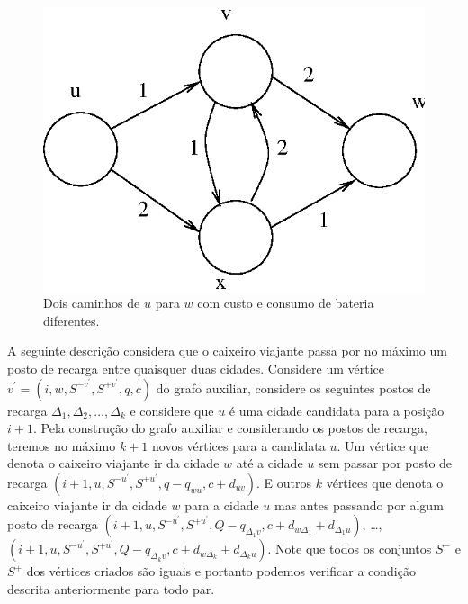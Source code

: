 \documentclass{article}
\begin{document}
\begin{figure}[ht]
  \centering
  \includegraphics[scale=.7]{fig3.eps}
  \caption{Dois caminhos de $u$ para $w$ com custo e consumo de bateria diferentes.}
  \label{fig3}
\end{figure}


A seguinte descrição considera que o caixeiro viajante passa por no máximo um posto de recarga entre quaisquer duas cidades. Considere um vértice $v^\prime=(i, w, S^{-v^\prime}, S^{+v^\prime}, q, c)$ do grafo auxiliar, considere os seguintes postos de recarga $\Delta_1, \Delta_2, \dots, \Delta_k$ e considere que $u$ é uma cidade candidata para a posição $i+1$. Pela construção do grafo auxiliar e considerando os postos de recarga, teremos no máximo $k + 1$ novos vértices para a candidata $u$. Um vértice que denota o caixeiro viajante ir da cidade $w$ até a cidade $u$ sem passar por posto de recarga $(i+1, u, S^{-u^\prime}, S^{+u^\prime}, q-q_{wu}, c+d_{uv})$. E outros $k$ vértices que denota o caixeiro viajante ir da cidade $w$ para a cidade $u$ mas antes passando por algum posto de recarga $(i+1, u, S^{-u^\prime}, S^{+u^\prime}, Q-q_{\Delta_1v}, c+d_{w\Delta_1} + d_{\Delta_1u})$, \dots, $(i+1, u, S^{-u^\prime}, S^{+u^\prime}, Q-q_{\Delta_kv}, c+d_{w\Delta_k} + d_{\Delta_ku})$. Note que todos os conjuntos $S^-$ e $S^+$ dos vértices criados são iguais e portanto podemos verificar a condição descrita anteriormente para todo par.

\medskip
\printbibliography
\end{document}
